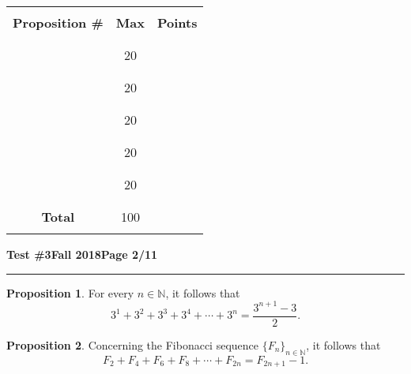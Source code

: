 \documentclass[11pt]{article}
\theoremstyle{definition}
\theoremstyle{theorem}
\newtheorem{proposition}{Proposition}
\begin{document}
\begin{center}
  \begin{tabular}{|c|c|c|}
    \hline
    && \\
    {\large\bf Proposition \#} & {\large\bf Max} & {\large\bf Points} \\
    && \\ \hline
    && \\
     & {\Large 20} & \\
    && \\ \hline
    && \\
     & {\Large 20} & \\
    && \\ \hline
    && \\
     & {\Large 20} & \\
    && \\ \hline
    && \\
     & {\Large 20} & \\
    && \\ \hline
    && \\
     & {\Large 20} & \\
    && \\ \hline \hline
    && \\
    {\large\bf Total} & {\Large 100} & \\
    && \\ \hline
  \end{tabular}
\end{center}
\newpage

\hfill{\large\bf Test \#3}\hfill{\large\bf Fall 2018}\hfill{\large\bf Page 2/11}\hrule

\bigskip
\begin{proposition}%
  For every $n \in \mathbb{N}$, it follows that
  \begin{equation*}
    3^1 + 3^2 + 3^3 + 3^4 + \dotsb + 3^n = \frac{3^{n+1}-3}{2}.
  \end{equation*}
\end{proposition}

\begin{proposition}%
  Concerning the Fibonacci sequence $\{ F_n \}_{n\in\mathbb{N}}$, it follows that
  \begin{equation*}
    F_2+F_4+F_6+F_8+\dotsb+F_{2n} = F_{2n+1}-1.
  \end{equation*}
\end{proposition}
\end{document}
